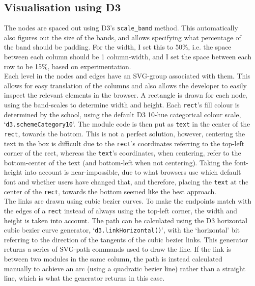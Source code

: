     \subsection{Visualisation using D3}
    The nodes are spaced out using D3's \texttt{scale\_band} method. This
    automatically also figures out the size of the bands, and allows specifying
    what percentage of the band should be padding. For the width, I set this to
    50\%, i.e. the space between each column should be 1 column-width, and I set
    the space between each row to be 15\%, based on experimentation.
    \\
    
    Each level in the nodes and edges have an SVG-group associated with them.
    This allows for easy translation of the columns and also allows the
    developer to easily inspect the relevant elements in the browser. A
    rectangle is drawn for each node, using the band-scales to determine width
    and height. Each \texttt{rect}'s fill colour is determined by the school,
    using the default D3 10-hue categorical colour scale,
    `\texttt{d3.schemeCategory10}'. The module code is then put as
    \texttt{text} in the center of the \texttt{rect}, towards the bottom. This
    is not a perfect solution, however, centering the text in the box is
    difficult due to the \texttt{rect}'s coordinates referring to the top-left
    corner of the rect, whereas the \texttt{text}'s coordinates, when centering,
    refer to the bottom-center of the text (and bottom-left when not
    centering). Taking the font-height into account is near-impossible, due to
    what browsers use which default font and whether users have changed that,
    and therefore, placing the \texttt{text} at the center of the \texttt{rect},
    towards the bottom seemed like the best approach.
    \\
    
    The links are drawn using cubic bezier curves. To make the endpoints match
    with the edges of a \texttt{rect} instead of always using the top-left
    corner, the width and height is taken into account. The path can be
    calculated using the D3 horizontal cubic bezier curve generator,
    `\texttt{d3.linkHorizontal()}', with the `horizontal' bit referring to the
    direction of the tangents of the cubic bezier links. This generator returns
    a series of SVG-path commands used to draw the line. If the link is between
    two modules in the same column, the path is instead calculated manually to
    achieve an arc (using a quadratic bezier line) rather than a straight line,
    which is what the generator returns in this case.
    
